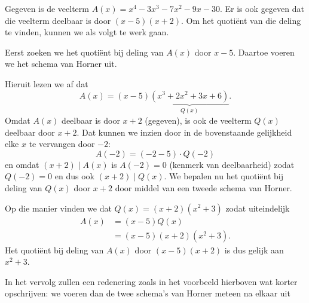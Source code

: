 \documentclass{ximera}
\begin{document}
\begin{example} 
Gegeven is de veelterm $A(x) = x^4 - 3x^3 - 7x^2 - 9 x - 30$. Er is ook gegeven dat die veelterm deelbaar is door $(x-5)(x+2)$. Om het quotiënt van die deling te vinden, kunnen we als volgt te werk gaan.

Eerst zoeken we het quotiënt bij deling van $A(x)$ door $x-5$. Daartoe voeren we het schema van Horner uit.
\renewcommand{\kolbreed}{\widthof{$-30$}}



Hieruit lezen we af dat
\[
A(x) = (x-5)\underbrace{(x^3 + 2x^2 + 3x + 6)}_{Q(x)}.
\] 
Omdat $A(x)$ deelbaar is door $x+2$ (gegeven), is ook de veelterm $Q(x)$ deelbaar door $x+2$. Dat kunnen we inzien door in de bovenstaande gelijkheid elke $x$ te vervangen door $-2$:
\[
A(-2) = (-2-5)\cdot Q(-2)
\]
en omdat $(x+2) \mid A(x)$ is $A(-2) = 0$ (kenmerk van deelbaarheid) zodat $Q(-2) = 0$ en dus ook $(x+2) \mid Q(x)$. We bepalen nu het quotiënt bij deling van $Q(x)$ door $x+2$ door middel van een tweede schema van Horner.
\renewcommand{\kolbreed}{\widthof{$-6$}}



Op die manier vinden we dat $Q(x) = (x+2)(x^2+3)$ zodat uiteindelijk
\begin{align*}
A(x) 
& = (x-5)Q(x) \\
& = (x-5)(x+2)(x^2+3).
\end{align*}
Het quotiënt bij deling van $A(x)$ door $(x-5)(x+2)$ is dus gelijk aan $x^2+3$. 
\end{example} 


In het vervolg zullen een redenering zoals in het voorbeeld hierboven wat korter opschrijven: we voeren dan de twee schema's van Horner meteen na elkaar uit
\renewcommand{\kolbreed}{\widthof{$-30$}}
\end{document}
